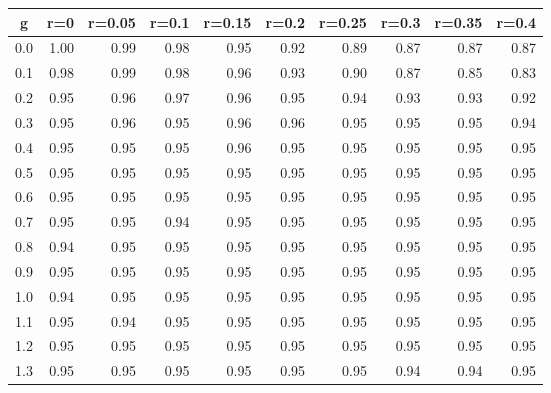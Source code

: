 %
\begin{table}[!tbp]
 \begin{center}
 \begin{tabular}{rrrrrrrrrr}\hline\hline
\multicolumn{1}{c}{g}&\multicolumn{1}{c}{r=0}&\multicolumn{1}{c}{r=0.05}&\multicolumn{1}{c}{r=0.1}&\multicolumn{1}{c}{r=0.15}&\multicolumn{1}{c}{r=0.2}&\multicolumn{1}{c}{r=0.25}&\multicolumn{1}{c}{r=0.3}&\multicolumn{1}{c}{r=0.35}&\multicolumn{1}{c}{r=0.4}\tabularnewline
\hline
0.0&1.00&0.99&0.98&0.95&0.92&0.89&0.87&0.87&0.87\tabularnewline
0.1&0.98&0.99&0.98&0.96&0.93&0.90&0.87&0.85&0.83\tabularnewline
0.2&0.95&0.96&0.97&0.96&0.95&0.94&0.93&0.93&0.92\tabularnewline
0.3&0.95&0.96&0.95&0.96&0.96&0.95&0.95&0.95&0.94\tabularnewline
0.4&0.95&0.95&0.95&0.96&0.95&0.95&0.95&0.95&0.95\tabularnewline
0.5&0.95&0.95&0.95&0.95&0.95&0.95&0.95&0.95&0.95\tabularnewline
0.6&0.95&0.95&0.95&0.95&0.95&0.95&0.95&0.95&0.95\tabularnewline
0.7&0.95&0.95&0.94&0.95&0.95&0.95&0.95&0.95&0.95\tabularnewline
0.8&0.94&0.95&0.95&0.95&0.95&0.95&0.95&0.95&0.95\tabularnewline
0.9&0.95&0.95&0.95&0.95&0.95&0.95&0.95&0.95&0.95\tabularnewline
1.0&0.94&0.95&0.95&0.95&0.95&0.95&0.95&0.95&0.95\tabularnewline
1.1&0.95&0.94&0.95&0.95&0.95&0.95&0.95&0.95&0.95\tabularnewline
1.2&0.95&0.95&0.95&0.95&0.95&0.95&0.95&0.95&0.95\tabularnewline
1.3&0.95&0.95&0.95&0.95&0.95&0.95&0.94&0.94&0.95\tabularnewline
\hline
\end{tabular}

\end{center}

\end{table}

